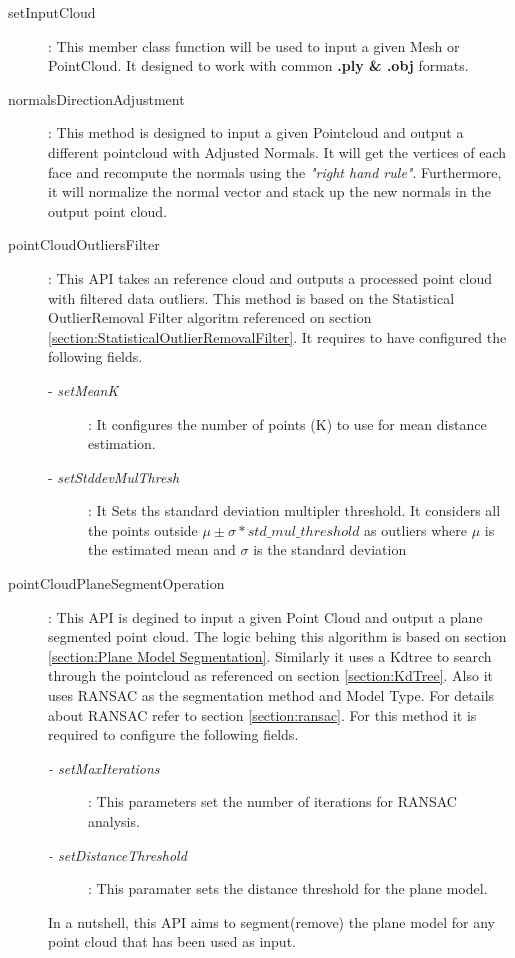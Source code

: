 \documentclass[12pt]{report}
\begin{document}
\begin{description}
  \item[setInputCloud]: This member class function will be used to input a given Mesh or PointCloud. It designed to work with common \textbf{.ply \& .obj} formats.
  \item[normalsDirectionAdjustment]: This method is designed to input a given Pointcloud and output a different pointcloud with Adjusted Normals.
   It will get the vertices of each face and recompute the normals using the \textit{"right hand rule"}. Furthermore, it will normalize the normal vector and stack up the new normals in the output point cloud.
  \item[pointCloudOutliersFilter]: This API takes an reference cloud and outputs a processed point cloud with filtered data outliers. This method is based on the Statistical OutlierRemoval Filter algoritm referenced on section \ref{section:StatisticalOutlierRemovalFilter}. It requires to have configured the following fields.
  \begin{description}
    \item[- \textit{setMeanK}] : It configures the number of points (K) to use for mean distance estimation.
    \item[- \textit{setStddevMulThresh}] : It Sets ths standard deviation multipler threshold. It considers all the points outside $\mu \pm \sigma *  std\_mul\_threshold$ as outliers where $\mu$ is the estimated mean and $\sigma$  is the standard deviation     
  \end{description} 
   \item[pointCloudPlaneSegmentOperation]: This API is degined to input a given Point Cloud and output a plane segmented point cloud. The logic behing this algorithm is based on section \ref{section:Plane Model Segmentation}.
   Similarly it uses a Kdtree to search through the pointcloud as referenced on section \ref{section:KdTree}. Also it uses RANSAC  as the segmentation method and Model Type. For details about RANSAC refer to section \ref{section:ransac}.
   For this method it is required to configure the following fields.
   \begin{description}
     \item[\textit{- setMaxIterations}] : This parameters set the number of  iterations for RANSAC  analysis.
     \item[\textit{- setDistanceThreshold}]: This paramater sets the distance threshold for the plane model.
   \end{description}
   In a nutshell, this API aims to segment(remove) the plane model for any point cloud that has been used as input.

\end{description}
\end{document}
